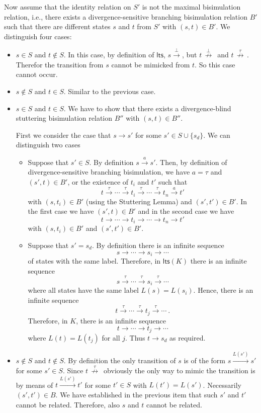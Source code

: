 \documentclass{llncs}
\newcommand{\ltsntrans}[1]{\,{\stackrel{{#1}}{\nrightarrow}}\,}
\newcommand{\ltstrans}[1]{\xrightarrow{#1}}
\newcommand{\kstrans}{\to}
\newcommand{\lts}{\mathsf{lts}}
\begin{document}
Now assume that the identity relation on $S'$ is not the maximal bisimulation relation, i.e.,  there exists a divergence-sensitive branching bisimulation relation $B'$ such that there are different states $s$ and $t$ from $S'$ with $(s,t) \in B'$. We distinguish four cases:
\begin{itemize}
\item $s \in S$ and $t \not\in S$. In this case, by definition of $\lts$, $s \ltstrans{\bot}$, but $t \ltsntrans{\bot}$ and $t \ltsntrans{\tau}$. Therefor the transition from $s$ cannot be mimicked from $t$. So this case cannot occur.

\item $s \not\in S$ and $t \in S$. Similar to the previous case.

\item $s \in S$ and $t \in S$. We have to show that there exists a divergence-blind stuttering bisimulation relation $B''$ with $(s,t) \in B''$.

First we consider the case that $s \kstrans s'$ for some $s'\in S \cup \{ s_d \}$. We can distinguish two cases
\begin{itemize}
\item Suppose that $s'\in S$. By definition $s \ltstrans{a} s'$. Then, by definition of divergence-sensitive branching bisimulation, we have $a=\tau$ and $(s',t) \in B'$, or the existence of $t_i$ and $t'$ such that
    \[ t \ltstrans{\tau} \cdots \ltstrans{\tau} t_i \ltstrans{\tau} \cdots \ltstrans{\tau} t_n \ltstrans{a} t'\]
     with $(s,t_i) \in B'$ (using the Stuttering Lemma) and $(s',t') \in B'$. In the first case we have $(s',t) \in B'$ and in the second case we have \[ t \kstrans \cdots \kstrans t_i \kstrans \cdots \kstrans t_n \kstrans t'\]  with $(s,t_i)\in B'$ and $(s',t') \in B'$.
\item Suppose that $s'=s_d$. By definition there is an infinite sequence
    \[ s \kstrans \cdots \kstrans s_i \kstrans \cdots \]
    of states with the same label. Therefore, in $\lts(K)$ there is an infinite sequence
    \[ s \ltstrans{\tau} \cdots \ltstrans{\tau} s_i \ltstrans{\tau} \cdots \]
    where all states have the same label $L(s) = L(s_i)$.
    Hence, there is an infinite sequence
    \[ t \ltstrans{\tau} \cdots \ltstrans{\tau} t_j \ltstrans{\tau} \cdots \ . \]
    Therefore, in $K$, there is an infinite sequence
    \[ t \kstrans \cdots \kstrans t_j \kstrans \cdots \]
    where $L(t) = L(t_j)$ for all $j$.
    Thus $t \kstrans s_d$ as required.
\end{itemize}

\item $s \not\in S$ and $t \not\in S$. By definition the only transition of $s$ is of the form $s \ltstrans{L(s')} s'$ for some $s'\in S$. Since $t \ltsntrans{\tau}$ obviously the only way to mimic the transition is by means of $t \ltstrans{L(s')} t'$ for some $t' \in S$ with $L(t') = L(s')$. Necessarily $(s',t') \in B$. We have established in the previous item that such $s'$ and $t'$ cannot be related. Therefore, also $s$ and $t$ cannot be related.
\end{itemize}
\end{document}
